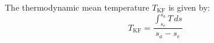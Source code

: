 The thermodynamic mean temperature \( T_{\text{KF}} \) is given by:  
\[
T_{\text{KF}} = \frac{\int_{s_e}^{s_a} T \, ds}{s_a - s_e}
\]